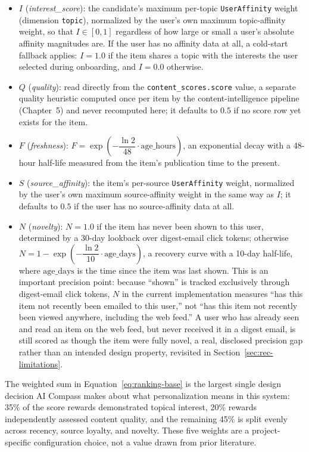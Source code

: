 \begin{itemize}
  \item $I$ (\emph{interest\_score}): the candidate's maximum per-topic \texttt{UserAffinity} weight (dimension \texttt{topic}), normalized by the user's own maximum topic-affinity weight, so that $I \in [0,1]$ regardless of how large or small a user's absolute affinity magnitudes are. If the user has no affinity data at all, a cold-start fallback applies: $I = 1.0$ if the item shares a topic with the interests the user selected during onboarding, and $I = 0.0$ otherwise.
  \item $Q$ (\emph{quality}): read directly from the \texttt{content\_scores.score} value, a separate quality heuristic computed once per item by the content-intelligence pipeline (Chapter~5) and never recomputed here; it defaults to $0.5$ if no score row yet exists for the item.
  \item $F$ (\emph{freshness}): $F = \exp\!\left(-\dfrac{\ln 2}{48}\cdot\text{age\_hours}\right)$, an exponential decay with a 48-hour half-life measured from the item's publication time to the present.
  \item $S$ (\emph{source\_affinity}): the item's per-source \texttt{UserAffinity} weight, normalized by the user's own maximum source-affinity weight in the same way as $I$; it defaults to $0.5$ if the user has no source-affinity data at all.
  \item $N$ (\emph{novelty}): $N = 1.0$ if the item has never been shown to this user, determined by a 30-day lookback over digest-email click tokens; otherwise $N = 1 - \exp\!\left(-\dfrac{\ln 2}{10}\cdot\text{age\_days}\right)$, a recovery curve with a 10-day half-life, where $\text{age\_days}$ is the time since the item was last shown. This is an important precision point: because ``shown'' is tracked exclusively through digest-email click tokens, $N$ in the current implementation measures ``has this item not recently been emailed to this user,'' not ``has this item not recently been viewed anywhere, including the web feed.'' A user who has already seen and read an item on the web feed, but never received it in a digest email, is still scored as though the item were fully novel, a real, disclosed precision gap rather than an intended design property, revisited in Section~\ref{sec:rec-limitations}.
\end{itemize}

The weighted sum in Equation~\ref{eq:ranking-base} is the largest single design decision AI Compass makes about what personalization means in this system: 35\% of the score rewards demonstrated topical interest, 20\% rewards independently assessed content quality, and the remaining 45\% is split evenly across recency, source loyalty, and novelty. These five weights are a project-specific configuration choice, not a value drawn from prior literature.

